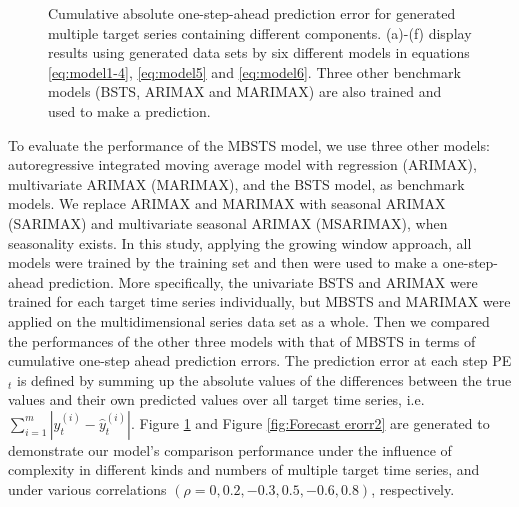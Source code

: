 \documentclass[twoside,11pt]{article}
\begin{document}
\begin{figure}[h]
	\caption{Cumulative absolute one-step-ahead prediction error for generated multiple target series containing different components. (a)-(f) display results using generated data sets by six different models in equations \eqref{eq:model1-4}, \eqref{eq:model5} and \eqref{eq:model6}. Three other benchmark models (BSTS, ARIMAX and MARIMAX) are also trained and used to make a prediction.}
	\label{fig:Forecast erorr1}
\end{figure}

To evaluate the performance of the MBSTS model, we use three other models: autoregressive integrated moving average model with regression (ARIMAX), multivariate ARIMAX (MARIMAX), and the BSTS model, as benchmark models. We replace ARIMAX and MARIMAX with seasonal ARIMAX (SARIMAX) and multivariate seasonal ARIMAX (MSARIMAX), when seasonality exists.
In this study, applying the growing window approach, all models were trained by the training set and then were used to make a one-step-ahead prediction. More specifically, the univariate BSTS and ARIMAX were trained for each target time series individually, but MBSTS and MARIMAX were applied on the multidimensional series data set as a whole. Then we compared the performances of the other three models with that of MBSTS in terms of cumulative one-step ahead prediction errors. The prediction error at each step PE$_t$ is defined by summing up the absolute values of the differences between the true values and their own predicted values over all target time series, i.e. $\sum_{i=1}^{m}{|y_t^{(i)}-\hat{y}_t^{(i)}|}$. Figure \ref{fig:Forecast erorr1} and Figure \ref{fig:Forecast erorr2} are generated to demonstrate our model's comparison performance under the influence of complexity in different kinds and numbers of multiple target time series, and under various correlations $(\rho=0, 0.2,-0.3, 0.5, -0.6, 0.8)$, respectively. 
\end{document}

